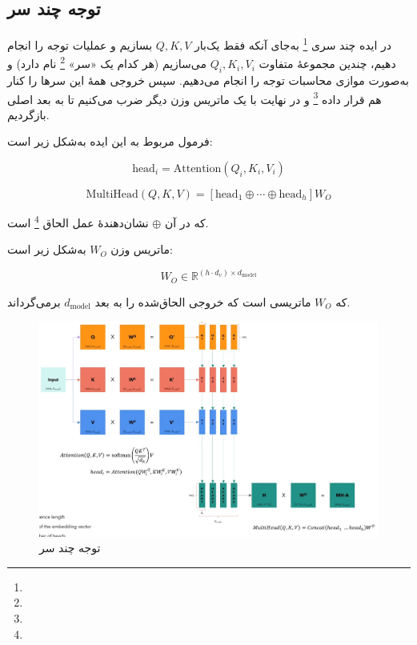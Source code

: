 \subsection{توجه چند سر}



در ایده چند سری \footnote{}  
به‌جای آنکه فقط یک‌بار \( Q, K, V \) بسازیم و عملیات توجه را انجام دهیم، چندین مجموعهٔ متفاوت \( Q_i, K_i, V_i \) می‌سازیم (هر کدام یک «سر» \footnote{} نام دارد) و به‌صورت موازی محاسبات توجه را انجام می‌دهیم. سپس خروجی همهٔ این سرها را کنار هم قرار داده \footnote{} و در نهایت با یک ماتریس وزن دیگر ضرب می‌کنیم تا به بعد اصلی بازگردیم.

فرمول مربوط به این ایده به‌شکل زیر است:


\begin{equation}
	\text{head}_i = \text{Attention}(Q_i, K_i, V_i)
	\label{eq:head_i}
\end{equation}


\begin{equation}
	\text{MultiHead}(Q, K, V) = [\text{head}_1 \oplus \cdots \oplus \text{head}_h] W_O
	\label{eq:multihead}
\end{equation}

که در آن \( \oplus \) نشان‌دهندهٔ عمل الحاق \footnote{} است.

ماتریس وزن \( W_O \) به‌شکل زیر است:

\[
W_O \in \mathbb{R}^{(h \cdot d_v) \times d_{\text{model}}}
\]

که \( W_O \) ماتریسی است که خروجی الحاق‌شده را به بعد \( d_{\text{model}} \) برمی‌گرداند.





\begin{figure}[h]
	\centering
	\begin{minipage}[b]{0.9\textwidth}
		\centering
		\includegraphics[width=\textwidth]{transformer_images/multi_head_attention.png}
		\caption{توجه چند سر}
		\label{fig:attention}
	\end{minipage}
	\hfill
	
\end{figure}



